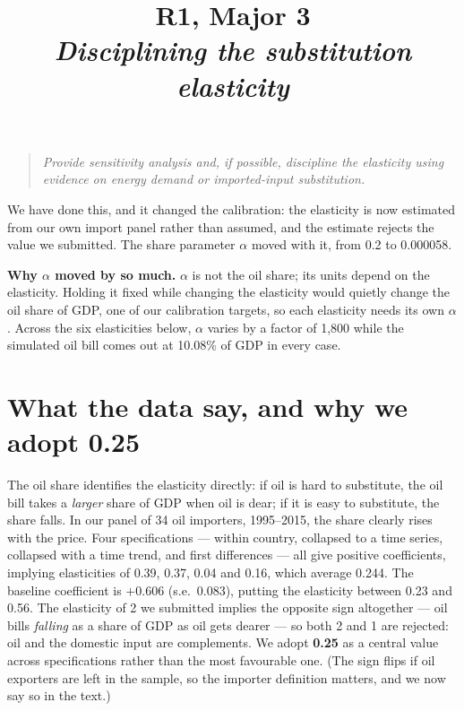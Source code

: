 \documentclass[11pt]{article}
\title{\textbf{R1, Major 3}\\[0.3em]
       \large\normalfont\itshape Disciplining the substitution elasticity}
\author{}
\date{}
\begin{document}
\maketitle
\vspace{-3em}


\begin{quote}\itshape
Provide sensitivity analysis and, if possible, discipline the elasticity using
evidence on energy demand or imported-input substitution.
\end{quote}

We have done this, and it changed the calibration: the elasticity is now
estimated from our own import panel rather than assumed, and the estimate
rejects the value we submitted. The share parameter $\alpha$ moved with it, from
0.2 to 0.000058.

\textbf{Why $\alpha$ moved by so much.} $\alpha$ is not the oil share; its units
depend on the elasticity. Holding it fixed while changing the elasticity would
quietly change the oil share of GDP, one of our calibration targets, so each
elasticity needs its own $\alpha$. Across the six elasticities below, $\alpha$
varies by a factor of 1,800 while the simulated oil bill comes out at 10.08\% of
GDP in every case.

\section*{What the data say, and why we adopt 0.25}

The oil share identifies the elasticity directly: if oil is hard to substitute,
the oil bill takes a \emph{larger} share of GDP when oil is dear; if it is easy
to substitute, the share falls. In our panel of 34 oil importers, 1995--2015,
the share clearly rises with the price. Four specifications --- within country,
collapsed to a time series, collapsed with a time trend, and first differences
--- all give positive coefficients, implying elasticities of 0.39, 0.37, 0.04
and 0.16, which average 0.244. The baseline coefficient is $+0.606$ (s.e.\
0.083), putting the elasticity between 0.23 and 0.56. The elasticity of 2 we
submitted implies the opposite sign altogether --- oil bills \emph{falling} as a
share of GDP as oil gets dearer --- so both 2 and 1 are rejected: oil and the
domestic input are complements. We adopt \textbf{0.25} as a central value across
specifications rather than the most favourable one. (The sign flips if oil
exporters are left in the sample, so the importer definition matters, and we now
say so in the text.)
\end{document}
